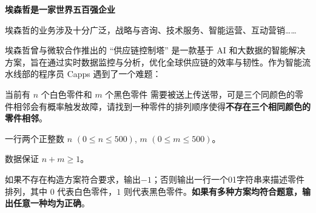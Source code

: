 
\textbf{埃森哲是一家世界五百强企业}

埃森哲的业务涉及十分广泛，战略与咨询、技术服务、智能运营、互动营销……

埃森哲曾与微软合作推出的 “供应链控制塔” 是一款基于 AI 和大数据的智能解决方案，旨在通过实时数据监控与分析，优化全球供应链的效率与韧性。作为智能流水线部的程序员 Capps 遇到了一个难题：

当前有 $n$ 个白色零件和 $m$ 个黑色零件 需要被送上传送带，可是三个同颜色的零件相邻会有概率触发故障，请找到一种零件的排列顺序使得\textbf{不存在三个相同颜色的零件相邻}。


一行两个正整数 $n$ $(0\leqslant n \leqslant 500)$, $m$ $(0 \leqslant m \leqslant 500)$。

数据保证 $n + m \geqslant 1$。


如果不存在构造方案符合要求，输出$-1$；否则输出一行一个01字符串来描述零件排列，其中 $0$ 代表白色零件，$1$ 则代表黑色零件。\textbf{如果有多种方案均符合题意，输出任意一种均为正确}。




